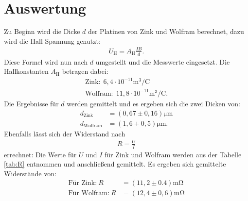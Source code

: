 \section{Auswertung}
\label{sec:Auswertung}
Zu Beginn wird die Dicke $d$ der Platinen von Zink und Wolfram
berechnet, dazu wird die Hall-Spannung genutzt:
\begin{align}
U_\mathrm{H}=A_\mathrm{H}\frac{IB}{d}.
\end{align}
Diese Formel wird nun nach $d$ umgestellt und die Messwerte eingesetzt.
Die Hallkonstanten $A_\mathrm{H}$ betragen dabei:
\begin{align*}
  \text{Zink:}\ \ 6,4\cdot10^{-11}\si{\meter\tothe{3}\per\coulomb}\\
  \text{Wolfram:}\ \ 11,8\cdot10^{-11}\si{\meter\tothe{3}\per\coulomb}.
  \end{align*}
Die Ergebnisse für $d$ werden gemittelt und es ergeben sich die zwei Dicken von:
\begin{align*}
d_\mathrm{Zink}&=(0,67\pm0,16)\si{\micro\meter}\\
d_\mathrm{Wolfram}&=(1,6\pm0,5)\si{\micro\meter}.
\end{align*}
Ebenfalls lässt sich
der Widerstand nach
\begin{align}
  R=\frac{U}{I}
\end{align}
errechnet:
Die Werte für $U$ und $I$ für Zink und Wolfram werden aus der Tabelle \ref{tab:R} entnommen und anschließend gemittelt.
Es ergeben sich gemittelte Widerstände von:
\begin{align*}
\text{Für Zink:} \ R&=(11,2\pm0.4)\si{\milli\ohm}\\
\text{Für Wolfram:} \ R&=(12,4\pm0,6)\si{\milli\ohm}
\end{align*}
